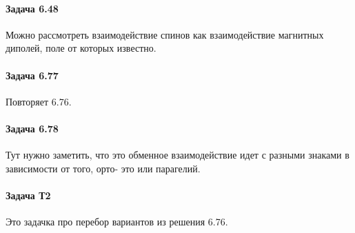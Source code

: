 \documentclass[12pt]{article}
\begin{document}
\paragraph{Задача 6.48} Можно рассмотреть взаимодействие спинов как взаимодействие магнитных диполей, поле от которых известно.
\paragraph{Задача 6.77} Повторяет 6.76.
\paragraph{Задача 6.78} Тут нужно заметить, что это обменное взаимодействие идет с разными знаками в зависимости от того, орто- это или парагелий.
\paragraph{Задача Т2} Это задачка про перебор вариантов из решения 6.76.
\end{document}
